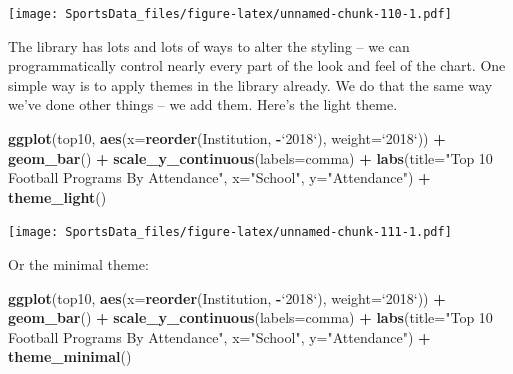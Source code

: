 \documentclass[]{book}
\newenvironment{Shaded}{\begin{snugshade}}{\end{snugshade}}
\newcommand{\DataTypeTok}[1]{\textcolor[rgb]{0.13,0.29,0.53}{#1}}
\newcommand{\KeywordTok}[1]{\textcolor[rgb]{0.13,0.29,0.53}{\textbf{#1}}}
\newcommand{\NormalTok}[1]{#1}
\newcommand{\OperatorTok}[1]{\textcolor[rgb]{0.81,0.36,0.00}{\textbf{#1}}}
\newcommand{\StringTok}[1]{\textcolor[rgb]{0.31,0.60,0.02}{#1}}
\begin{document}
\texttt{[image: SportsData\_files/figure-latex/unnamed-chunk-110-1.pdf]}

The library has lots and lots of ways to alter the styling -- we can programmatically control nearly every part of the look and feel of the chart. One simple way is to apply themes in the library already. We do that the same way we've done other things -- we add them. Here's the light theme.

\begin{Shaded}
\begin{Highlighting}[]
\KeywordTok{ggplot}\NormalTok{(top10, }\KeywordTok{aes}\NormalTok{(}\DataTypeTok{x=}\KeywordTok{reorder}\NormalTok{(Institution, }\OperatorTok{-}\StringTok{`}\DataTypeTok{2018}\StringTok{`}\NormalTok{), }\DataTypeTok{weight=}\StringTok{`}\DataTypeTok{2018}\StringTok{`}\NormalTok{)) }\OperatorTok{+}\StringTok{ }
\StringTok{  }\KeywordTok{geom_bar}\NormalTok{() }\OperatorTok{+}\StringTok{ }
\StringTok{  }\KeywordTok{scale_y_continuous}\NormalTok{(}\DataTypeTok{labels=}\NormalTok{comma) }\OperatorTok{+}\StringTok{ }
\StringTok{  }\KeywordTok{labs}\NormalTok{(}\DataTypeTok{title=}\StringTok{"Top 10 Football Programs By Attendance"}\NormalTok{, }\DataTypeTok{x=}\StringTok{"School"}\NormalTok{, }\DataTypeTok{y=}\StringTok{"Attendance"}\NormalTok{) }\OperatorTok{+}\StringTok{ }
\StringTok{  }\KeywordTok{theme_light}\NormalTok{()}
\end{Highlighting}
\end{Shaded}

\texttt{[image: SportsData\_files/figure-latex/unnamed-chunk-111-1.pdf]}

Or the minimal theme:

\begin{Shaded}
\begin{Highlighting}[]
\KeywordTok{ggplot}\NormalTok{(top10, }\KeywordTok{aes}\NormalTok{(}\DataTypeTok{x=}\KeywordTok{reorder}\NormalTok{(Institution, }\OperatorTok{-}\StringTok{`}\DataTypeTok{2018}\StringTok{`}\NormalTok{), }\DataTypeTok{weight=}\StringTok{`}\DataTypeTok{2018}\StringTok{`}\NormalTok{)) }\OperatorTok{+}\StringTok{ }
\StringTok{  }\KeywordTok{geom_bar}\NormalTok{() }\OperatorTok{+}\StringTok{ }
\StringTok{  }\KeywordTok{scale_y_continuous}\NormalTok{(}\DataTypeTok{labels=}\NormalTok{comma) }\OperatorTok{+}\StringTok{ }
\StringTok{  }\KeywordTok{labs}\NormalTok{(}\DataTypeTok{title=}\StringTok{"Top 10 Football Programs By Attendance"}\NormalTok{, }\DataTypeTok{x=}\StringTok{"School"}\NormalTok{, }\DataTypeTok{y=}\StringTok{"Attendance"}\NormalTok{) }\OperatorTok{+}\StringTok{ }
\StringTok{  }\KeywordTok{theme_minimal}\NormalTok{()}
\end{Highlighting}
\end{Shaded}
\end{document}
